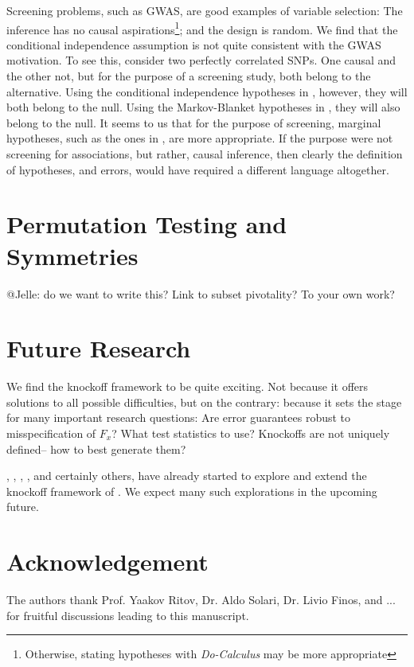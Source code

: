 \documentclass[article,lineno]{biometrika}
\begin{document}
Screening problems, such as GWAS, are good examples of variable selection:
The inference has no causal aspirations\footnote{Otherwise, stating hypotheses with \emph{Do-Calculus} \citep{pearl1995causal} may be more appropriate};
and the design is random.
We find that the conditional independence assumption is not quite consistent with the GWAS motivation. 
To see this, consider two perfectly correlated SNPs. 
One causal and the other not, but for the purpose of a screening study, both belong to the alternative. 
Using the conditional independence hypotheses in \cite{SesiaGenehuntinghidden}, however, they will both belong to the null. 
Using the Markov-Blanket hypotheses in \cite{CandesPanninggoldmodelX2018}, they will also belong to the null. 
It seems to us that for the purpose of screening, marginal hypotheses, such as the ones in \cite{TusherSignificanceanalysismicroarrays2001}, are more appropriate. 
If the purpose were not screening for associations, but rather, causal inference, then clearly the definition of hypotheses, and errors, would have required a different language altogether. 




\section{Permutation Testing and Symmetries}
@Jelle: do we want to write this? 
Link to subset pivotality? 
To your own work?



\section{Future Research}

We find the knockoff framework to be quite exciting. 
Not because it offers solutions to all possible difficulties, but on the contrary: because it sets the stage for many important research questions:
Are error guarantees robust to misspecification of $F_x$?
What test statistics to use?
Knockoffs are not uniquely defined-- how to best generate them?

\cite{DaiknockofffilterFDR2016}, \cite{JansonFamilywiseerrorrate2016}, \cite{ChenAnalysisKnockoffFilter2017}, \cite{ChenPseudoKnockoffFilter2017}, and certainly others, have already started to explore and extend the knockoff framework of \cite{BarberControllingfalsediscovery2015}. 
We expect many such explorations in the upcoming future. 



\section*{Acknowledgement}
The authors thank Prof. Yaakov Ritov, Dr. Aldo Solari, Dr. Livio Finos, and ... for fruitful discussions leading to this manuscript. 






\end{document}
